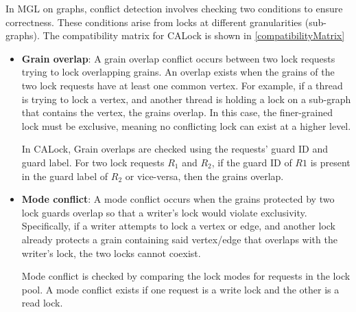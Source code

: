 In MGL on graphs, conflict detection involves checking two conditions to ensure correctness. These conditions arise from locks at different granularities (sub-graphs). The compatibility matrix for CALock is shown in \cref{compatibilityMatrix}
\begin{itemize}
	\item \textbf{Grain overlap}: A grain overlap conflict occurs between two lock requests trying to lock overlapping grains. An overlap exists when the grains of the two lock requests have at least one common vertex. For example, if a thread is trying to lock a vertex, and another thread is holding a lock on a sub-graph that contains the vertex, the grains overlap. In this case, the finer-grained lock must be exclusive, meaning no conflicting lock can exist at a higher level.
	
	In CALock, Grain overlaps are checked using the requests' guard ID and guard label. For two lock requests $R_1$ and $R_2$, if the guard ID of $R1$ is present in the guard label of $R_2$ or vice-versa, then the grains overlap.
	
	\item \textbf{Mode conflict}: A mode conflict occurs when the grains protected by two lock guards overlap so that a writer's lock would violate exclusivity. Specifically, if a writer attempts to lock a vertex or edge, and another lock already protects a grain containing said vertex/edge that overlaps with the writer's lock, the two locks cannot coexist.
	
	Mode conflict is checked by comparing the lock modes for requests in the lock pool. A mode conflict exists if one request is a write lock and the other is a read lock.
\end{itemize}



